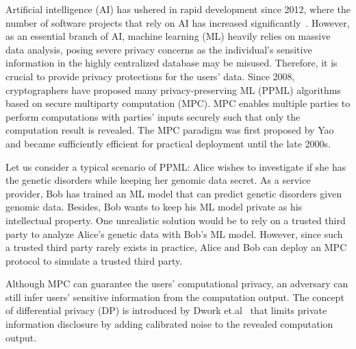 



Artificial intelligence (AI) has ushered in rapid development since 2012, where the number of software projects that rely on AI has increased significantly~\cite{clark_2015}. However, as an essential branch of AI, machine learning (ML) heavily relies on massive data analysis, posing severe privacy concerns as the individual's sensitive information in the highly centralized database may be misused. Therefore, it is crucial to provide privacy protections for the users' data. Since 2008, cryptographers have proposed many privacy-preserving ML (PPML) algorithms based on secure multiparty computation (MPC). MPC enables multiple parties to perform computations with parties' inputs securely such that only the computation result is revealed. The MPC paradigm was first proposed by Yao~\cite{Yao86} and became sufficiently efficient for practical deployment until the late 2000s.

Let us consider a typical scenario of PPML: Alice wishes to investigate if she has the genetic disorders while keeping her genomic data secret. As a service provider, Bob has trained an ML model that can predict genetic disorders given genomic data. Besides, Bob wants to keep his ML model private as his intellectual property. One unrealistic solution would be to rely on a trusted third party to analyze Alice's genetic data with Bob's ML model. However, since such a trusted third party rarely exists in practice, Alice and Bob can deploy an MPC protocol to simulate a trusted third party.

Although MPC can guarantee the users' computational privacy, an adversary can still infer users' sensitive information from the computation output.  The concept of differential privacy (DP) is introduced by Dwork et.al~\cite{dwork2006differential, dwork2006calibrating} that limits private information disclosure by adding calibrated noise to the revealed computation output.

